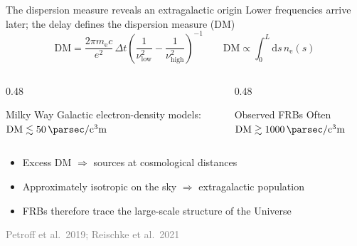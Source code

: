 \documentclass[aspectratio=1610, 10pt]{beamer}
\newcommand{\source}[1]{{\par\hfill\tiny\textcolor{gray}{#1}\par}}
\begin{document}
\begin{frame}{The dispersion measure reveals an extragalactic origin}
  Lower frequencies arrive later; the delay defines the dispersion measure (DM)
  \begin{equation*}
    \mathrm{DM} = \frac{2\pi m_{\mathrm{e}} c}{e^2}\, \Delta t
    \left( \frac{1}{\nu_{\mathrm{low}}^2} - \frac{1}{\nu_{\mathrm{high}}^2} \right)^{-1}
    \qquad
    \mathrm{DM} \propto \int_0^{L} \mathrm{d}s\, n_{\mathrm{e}}(s)
  \end{equation*}
  \begin{columns}[t]
    \begin{column}{0.48\textwidth}
      \begin{block}{Milky Way}
        Galactic electron-density models: \\
        $\mathrm{DM} \lesssim \qty{50}{\parsec\per\cubic\centi\metre}$
      \end{block}
    \end{column}
    \begin{column}{0.48\textwidth}
      \begin{block}{Observed FRBs}
        Often \\
        $\mathrm{DM} \gtrsim \qty{1000}{\parsec\per\cubic\centi\metre}$
      \end{block}
    \end{column}
  \end{columns}
  \bigskip
  \begin{itemize}
    \item Excess DM $\Rightarrow$ sources at \alert{cosmological distances}
    \item Approximately isotropic on the sky $\Rightarrow$ extragalactic population
    \item FRBs therefore trace the \alert{large-scale structure} of the Universe
  \end{itemize}
  \source{Petroff et al.\ 2019; Reischke et al.\ 2021}
\end{frame}
\end{document}

